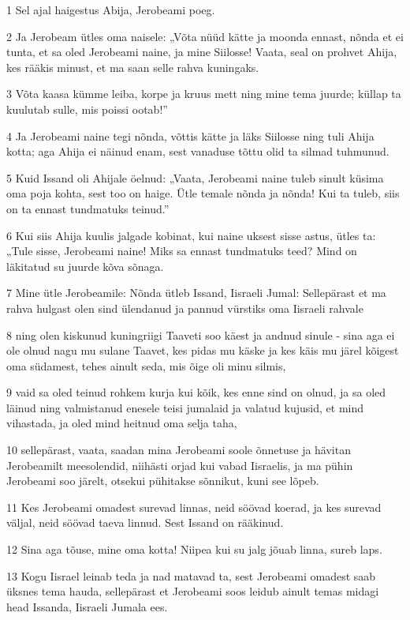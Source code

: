 \par 1 Sel ajal haigestus Abija, Jerobeami poeg.
\par 2 Ja Jerobeam ütles oma naisele: „Võta nüüd kätte ja moonda ennast, nõnda et ei tunta, et sa oled Jerobeami naine, ja mine Siilosse! Vaata, seal on prohvet Ahija, kes rääkis minust, et ma saan selle rahva kuningaks.
\par 3 Võta kaasa kümme leiba, korpe ja kruus mett ning mine tema juurde; küllap ta kuulutab sulle, mis poissi ootab!”
\par 4 Ja Jerobeami naine tegi nõnda, võttis kätte ja läks Siilosse ning tuli Ahija kotta; aga Ahija ei näinud enam, sest vanaduse tõttu olid ta silmad tuhmunud.
\par 5 Kuid Issand oli Ahijale öelnud: „Vaata, Jerobeami naine tuleb sinult küsima oma poja kohta, sest too on haige. Ütle temale nõnda ja nõnda! Kui ta tuleb, siis on ta ennast tundmatuks teinud.”
\par 6 Kui siis Ahija kuulis jalgade kobinat, kui naine uksest sisse astus, ütles ta: „Tule sisse, Jerobeami naine! Miks sa ennast tundmatuks teed? Mind on läkitatud su juurde kõva sõnaga.
\par 7 Mine ütle Jerobeamile: Nõnda ütleb Issand, Iisraeli Jumal: Sellepärast et ma rahva hulgast olen sind ülendanud ja pannud vürstiks oma Iisraeli rahvale
\par 8 ning olen kiskunud kuningriigi Taaveti soo käest ja andnud sinule - sina aga ei ole olnud nagu mu sulane Taavet, kes pidas mu käske ja kes käis mu järel kõigest oma südamest, tehes ainult seda, mis õige oli minu silmis,
\par 9 vaid sa oled teinud rohkem kurja kui kõik, kes enne sind on olnud, ja sa oled läinud ning valmistanud enesele teisi jumalaid ja valatud kujusid, et mind vihastada, ja oled mind heitnud oma selja taha,
\par 10 sellepärast, vaata, saadan mina Jerobeami soole õnnetuse ja hävitan Jerobeamilt meesolendid, niihästi orjad kui vabad Iisraelis, ja ma pühin Jerobeami soo järelt, otsekui pühitakse sõnnikut, kuni see lõpeb.
\par 11 Kes Jerobeami omadest surevad linnas, neid söövad koerad, ja kes surevad väljal, neid söövad taeva linnud. Sest Issand on rääkinud.
\par 12 Sina aga tõuse, mine oma kotta! Niipea kui su jalg jõuab linna, sureb laps.
\par 13 Kogu Iisrael leinab teda ja nad matavad ta, sest Jerobeami omadest saab üksnes tema hauda, sellepärast et Jerobeami soos leidub ainult temas midagi head Issanda, Iisraeli Jumala ees.
